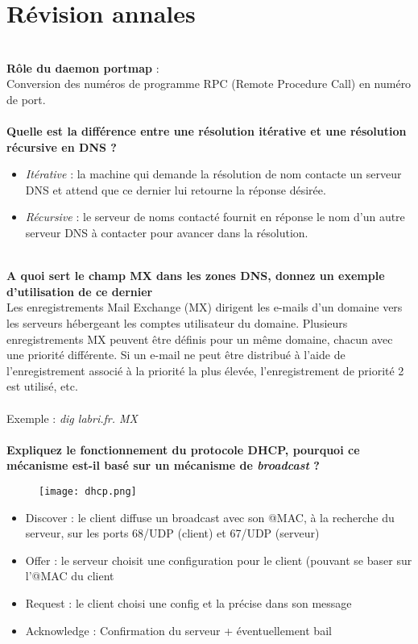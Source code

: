 \documentclass[journal, a4paper]{IEEEtran}
\begin{document}
\section{Révision annales}
~\\
\textbf{Rôle du daemon portmap} :\\
Conversion des numéros de programme RPC (Remote Procedure Call) en numéro de port.
~\\
~\\
\textbf{Quelle est la différence entre une résolution itérative et une résolution récursive en DNS ?}\\
\begin{itemize}
	\item \textit{Itérative} : la machine qui demande la résolution de nom contacte un serveur DNS et attend que ce dernier lui retourne la réponse désirée.
	\item \textit{Récursive} : le serveur de noms contacté fournit en réponse le nom d’un autre serveur DNS à contacter pour avancer dans la résolution.
\end{itemize}
~\\
\textbf{A quoi sert le champ MX dans les zones DNS, donnez un exemple d'utilisation de ce dernier}\\
Les enregistrements Mail Exchange (MX) dirigent les e-mails d'un domaine vers les serveurs hébergeant les comptes utilisateur du domaine. Plusieurs enregistrements MX peuvent être définis pour un même domaine, chacun avec une priorité différente. Si un e-mail ne peut être distribué à l'aide de l'enregistrement associé à la priorité la plus élevée, l'enregistrement de priorité 2 est utilisé, etc.
~\\
~\\
Exemple : \textit{dig labri.fr. MX}
~\\
~\\
\textbf{Expliquez le fonctionnement du protocole DHCP, pourquoi ce mécanisme est-il basé sur un mécanisme de \textit{broadcast} ?}\\
\begin{figure}[!hbt]
	\begin{center}
	\texttt{[image: dhcp.png]}
	\label{fig:dhcp}
	\end{center}
\end{figure}
\begin{itemize}
	\item Discover : le client diffuse un broadcast avec son @MAC, à la recherche du serveur, sur les ports 68/UDP (client) et 67/UDP (serveur)
	\item Offer : le serveur choisit une configuration pour le client (pouvant se baser sur l'@MAC du client
	\item Request : le client choisi une config et la précise dans son message
	\item Acknowledge : Confirmation du serveur + éventuellement bail
\end{itemize}
\end{document}
